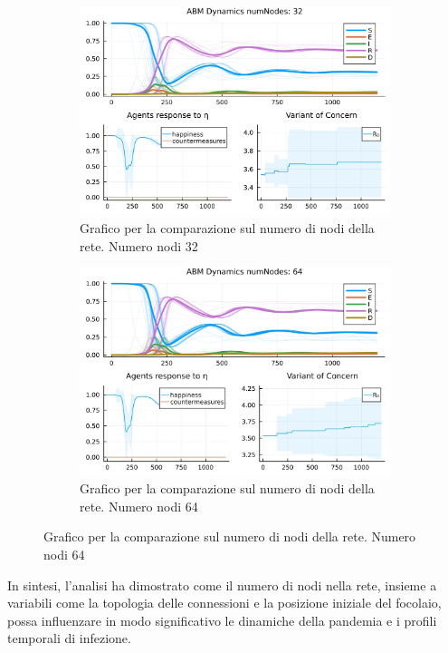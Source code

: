 \begin{figure}[H]
\begin{subfigure}[b]{0.45\textwidth}
		\includegraphics[width=\textwidth]{img/SocialNetworkABM_3_NN.jpg}
		\caption{Grafico per la comparazione sul numero di nodi della rete. Numero nodi 32}
		\label{fig:comparison_numberOfNodes_32}
	\end{subfigure}
	\hfill
	\begin{subfigure}[b]{0.45\textwidth}
		\centering
		\includegraphics[width=\textwidth]{img/SocialNetworkABM_4_NN.jpg}
		\caption{Grafico per la comparazione sul numero di nodi della rete. Numero nodi 64}
		\label{fig:comparison_numberOfNodes_64}
	\end{subfigure}
\end{figure}

In sintesi, l'analisi ha dimostrato come il numero di nodi nella rete, 
insieme a variabili come la topologia delle connessioni e la posizione 
iniziale del focolaio, possa influenzare in modo significativo le 
dinamiche della pandemia e i profili temporali di infezione.


